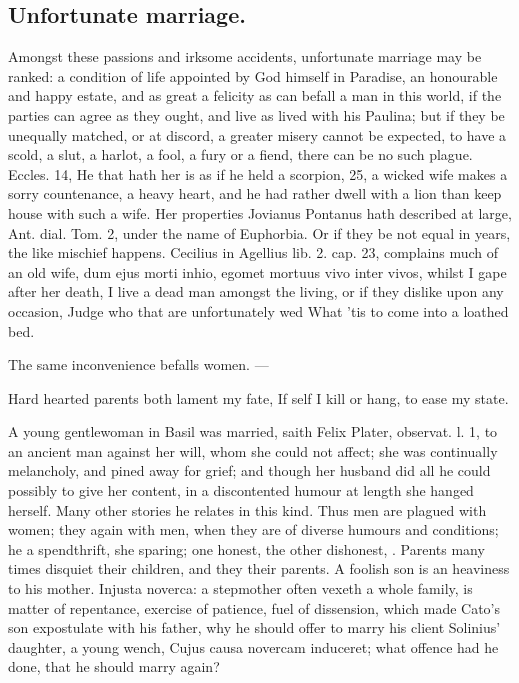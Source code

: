 {{\subsection{Unfortunate marriage.}
Amongst these passions and irksome accidents,
unfortunate marriage may be ranked: a condition of life appointed by
God himself in Paradise, an honourable and happy estate, and as great a
felicity as can befall a man in this world, if the parties can
agree as they ought, and live as \Seneca lived with his Paulina;
but if they be unequally matched, or at discord, a greater misery
cannot be expected, to have a scold, a slut, a harlot, a fool, a fury
or a fiend, there can be no such plague. Eccles.  14, He that hath
her is as if he held a scorpion, \etc{}  25, a wicked wife makes a
sorry countenance, a heavy heart, and he had rather dwell with a lion
than keep house with such a wife. Her properties Jovianus
Pontanus hath described at large, Ant. dial. Tom. 2, under the name of
Euphorbia. Or if they be not equal in years, the like mischief happens.
Cecilius in Agellius lib. 2. cap. 23, complains much of an old wife,
dum ejus morti inhio, egomet mortuus vivo inter vivos, whilst I gape
after her death, I live a dead man amongst the living, or if they
dislike upon any occasion,
Judge who that are unfortunately wed
What 'tis to come into a loathed bed.

The same inconvenience befalls women.
---

Hard hearted parents both lament my fate,
If self I kill or hang, to ease my state.

A young gentlewoman in Basil was married, saith Felix Plater,
observat. l. 1, to an ancient man against her will, whom she could not
affect; she was continually melancholy, and pined away for grief; and
though her husband did all he could possibly to give her content, in a
discontented humour at length she hanged herself. Many other stories he
relates in this kind. Thus men are plagued with women; they again with
men, when they are of diverse humours and conditions; he a spendthrift,
she sparing; one honest, the other dishonest, \etc{}. Parents many times
disquiet their children, and they their parents. A foolish son is
an heaviness to his mother. Injusta noverca: a stepmother often vexeth
a whole family, is matter of repentance, exercise of patience, fuel of
dissension, which made Cato's son expostulate with his father, why he
should offer to marry his client Solinius' daughter, a young wench,
Cujus causa novercam induceret; what offence had he done, that he
should marry again?

}}
